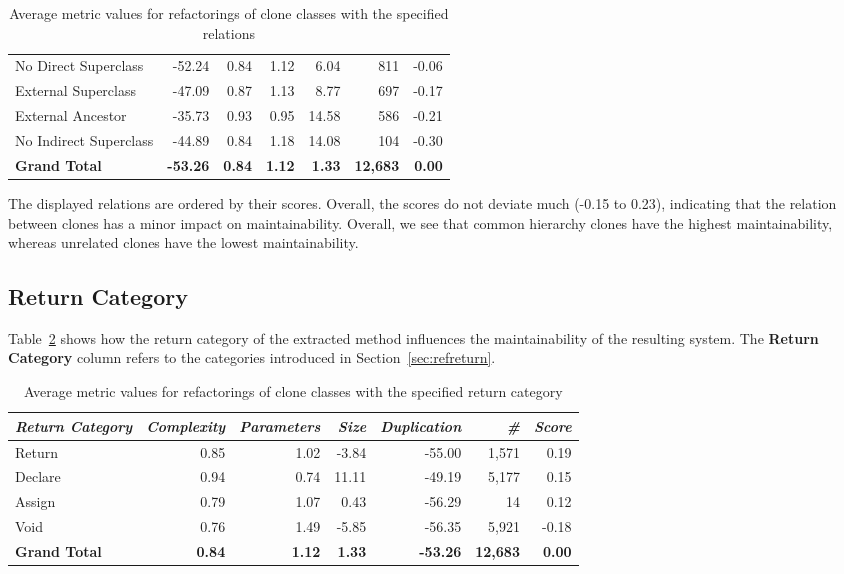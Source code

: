 \begin{table}[H]
{\begin{tabular}{@{}lrrrrrr@{}}
\hspace{10pt} No Direct Superclass & -52.24 & 0.84 & 1.12 & 6.04 & 811 & -0.06 \\
\hspace{10pt} External Superclass & -47.09 & 0.87 & 1.13 & 8.77 & 697 & -0.17 \\
\hspace{10pt} External Ancestor & -35.73 & 0.93 & 0.95 & 14.58 & 586 & -0.21 \\
\hspace{10pt} No Indirect Superclass & -44.89 & 0.84 & 1.18 & 14.08 & 104 & -0.30 \\ \midrule
\textbf{Grand Total} & \textbf{-53.26} & \textbf{0.84} & \textbf{1.12} & \textbf{1.33} & \textbf{12,683} & \textbf{0.00} \\ \bottomrule
\end{tabular}%
}
\caption{Average metric values for refactorings of clone classes with the specified relations}
\label{tab:relationref}
\end{table}

The displayed relations are ordered by their scores. Overall, the scores do not deviate much (-0.15 to 0.23), indicating that the relation between clones has a minor impact on maintainability. Overall, we see that common hierarchy clones have the highest maintainability, whereas unrelated clones have the lowest maintainability.

\subsection{Return Category}
Table~\ref{tab:return} shows how the return category of the extracted method influences the maintainability of the resulting system. The \textbf{Return Category} column refers to the categories introduced in Section~\ref{sec:refreturn}.

\begin{table}[H]
\centering
\begin{tabular}{@{}lrrrrrr@{}}
\toprule
\textit{\textbf{Return Category}} & \textit{\textbf{Complexity}} & \textit{\textbf{Parameters}} & \textit{\textbf{Size}} & \textit{\textbf{Duplication}} & \textit{\textbf{\#}} & \textit{\textbf{Score}} \\ \midrule
Return & 0.85 & 1.02 & -3.84 & -55.00 & 1,571 & 0.19 \\
Declare & 0.94 & 0.74 & 11.11 & -49.19 & 5,177 & 0.15 \\
\rowcolor[HTML]{FFCCC9}
Assign & 0.79 & 1.07 & 0.43 & -56.29 & 14 & 0.12 \\
Void & 0.76 & 1.49 & -5.85 & -56.35 & 5,921 & -0.18 \\ \midrule
\textbf{Grand Total} & \textbf{0.84} & \textbf{1.12} & \textbf{1.33} & \textbf{-53.26} & \textbf{12,683} & \textbf{0.00} \\ \bottomrule
\end{tabular}%
\caption{Average metric values for refactorings of clone classes with the specified return category}
\label{tab:return}
\end{table}

